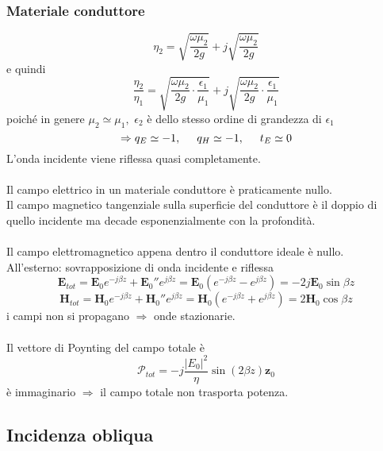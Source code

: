 \documentclass[a4paper]{article}
\begin{document}
\subsubsection*{Materiale conduttore}
\begin{equation*}
\eta_2=\sqrt{\frac{\omega\mu_2}{2g}}+j\sqrt{\frac{\omega\mu_2}{2g}}
\end{equation*}
e quindi
\begin{equation*}
\frac{\eta_2}{\eta_1}=\sqrt{\frac{\omega\mu_2}{2g}\cdot\frac{\epsilon_1}{\mu_1}}+j\sqrt{\frac{\omega\mu_2}{2g}\cdot\frac{\epsilon_1}{\mu_1}}
\end{equation*}
poiché in genere $\mu_2\simeq\mu_1,\,\,\epsilon_2$ è dello stesso ordine di grandezza di $\epsilon_1$
\begin{equation*}
\Rightarrow q_E\simeq-1,\hspace{5mm}q_H\simeq-1,\hspace{5mm}t_E\simeq 0
\end{equation*}
L'onda incidente viene riflessa quasi completamente.\\\\
Il campo elettrico in un materiale conduttore è praticamente nullo.\\
Il campo magnetico tangenziale sulla superficie del conduttore è il doppio di quello incidente ma decade esponenzialmente con la profondità.\\\\
Il campo elettromagnetico appena dentro il conduttore ideale è nullo.\\
All'esterno: sovrapposizione di onda incidente e riflessa
\begin{equation*}
\textbf{E}_{tot}=\textbf{E}_0e^{-j\beta z}+\textbf{E}_0''e^{j\beta z}=\textbf{E}_0(e^{-j\beta z}-e^{j\beta z})=-2j\textbf{E}_0\sin\beta z
\end{equation*}
\begin{equation*}
\textbf{H}_{tot}=\textbf{H}_0e^{-j\beta z}+\textbf{H}_0''e^{j\beta z}=\textbf{H}_0(e^{-j\beta z}+e^{j\beta z})=2\textbf{H}_0\cos\beta z
\end{equation*}
i campi non si propagano $\Rightarrow$ onde stazionarie.\\\\
Il vettore di Poynting del campo totale è
\begin{equation*}
\bm{\mathcal{P}}_{tot}=-j\frac{|E_0|^2}{\eta}\sin(2\beta z)\textbf{z}_0
\end{equation*}
è immaginario $\Rightarrow$ il campo totale non trasporta potenza.
\subsection*{Incidenza obliqua}
\end{document}
